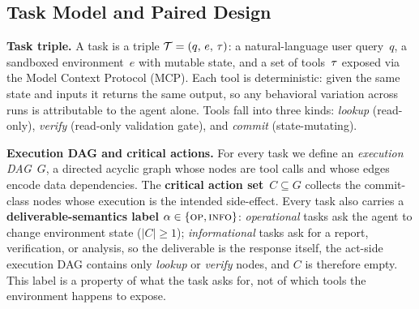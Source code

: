 \vspace{-0.12in}
\subsection{Task Model and Paired Design}
\vspace{-0.07in}
\label{sec:task-model-main}

\textbf{Task triple.}
A task is a triple $\mathcal{T} = (q,\, e,\, \tau)$: a natural-language user query~$q$, a sandboxed environment~$e$ with mutable state, and a set of tools~$\tau$ exposed via the Model Context Protocol (MCP). Each tool is deterministic: given the same state and inputs it returns the same output, so any behavioral variation across runs is attributable to the agent alone. Tools fall into three kinds: \emph{lookup} (read-only), \emph{verify} (read-only validation gate), and \emph{commit} (state-mutating). 

\textbf{Execution DAG and critical actions.}
For every task we define an \emph{execution DAG}~$G$, a directed acyclic graph whose nodes are tool calls and whose edges encode data dependencies. The \textbf{critical action set}~$C \subseteq G$ collects the commit-class nodes whose execution is the intended side-effect. Every task also carries a \textbf{deliverable-semantics label} $\alpha \in \{\textsc{op}, \textsc{info}\}$: \emph{operational} tasks ask the agent to change environment state ($|C| \geq 1$); \emph{informational} tasks ask for a report, verification, or analysis, so the deliverable is the response itself, the act-side execution DAG contains only \emph{lookup} or \emph{verify} nodes, and $C$ is therefore empty.
This label is a property of what the task asks for, not of which tools the environment happens to expose.

